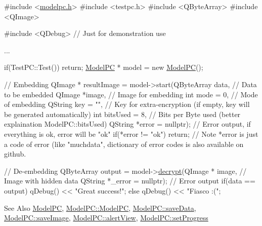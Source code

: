 \begin{DoxyCode}
\textcolor{preprocessor}{#include <\hyperlink{modelpc_8h}{modelpc.h}>}
\textcolor{preprocessor}{#include <testpc.h>}
\textcolor{preprocessor}{#include <QByteArray>}
\textcolor{preprocessor}{#include <QImage>}

\textcolor{preprocessor}{#include <QDebug>} \textcolor{comment}{// Just for demonstration use}

...

if(TestPC::Test())
    \textcolor{keywordflow}{return};
\hyperlink{class_model_p_c}{ModelPC} * model = \textcolor{keyword}{new} \hyperlink{class_model_p_c}{ModelPC}();

\textcolor{comment}{// Embedding}
QImage * resultImage = model->start(QByteArray data, \textcolor{comment}{// Data to be embedded}
                                    QImage *image, \textcolor{comment}{// Image for embedding}
                                    \textcolor{keywordtype}{int} mode = 0, \textcolor{comment}{// Mode of embedding}
                                    QString key = \textcolor{stringliteral}{""}, \textcolor{comment}{// Key for extra-encryption (if empty, key will be
       generated automatically)}
                                    \textcolor{keywordtype}{int} bitsUsed = 8, \textcolor{comment}{// Bits per Byte used (better explaination
       ModelPC::bitsUsed)}
                                    QString *error = \textcolor{keyword}{nullptr}); \textcolor{comment}{// Error output, if everything is ok, error
       will be "ok"}
\textcolor{keywordflow}{if}(*error != \textcolor{stringliteral}{"ok"})
    \textcolor{keywordflow}{return};
\textcolor{comment}{// Note *error is just a code of error (like "muchdata", dictionary of error codes is also available on
       github.}

\textcolor{comment}{// De-embedding}
QByteArray output = model->\hyperlink{class_model_p_c_a5995215a34a1e1f504035715a8013809}{decrypt}(QImage * image, \textcolor{comment}{// Image with hidden data}
                                   QString *\_error = \textcolor{keyword}{nullptr}); \textcolor{comment}{// Error output}
\textcolor{keywordflow}{if}(data == output)
   qDebug() << \textcolor{stringliteral}{"Great success!"};
\textcolor{keywordflow}{else}
   qDebug() << \textcolor{stringliteral}{"Fiasco :("};
\end{DoxyCode}
 \begin{DoxySeeAlso}{See Also}
\hyperlink{class_model_p_c}{Model\-P\-C}, \hyperlink{class_model_p_c_ae12ebe65ec973c02a0de4850a7c1e31c}{Model\-P\-C\-::\-Model\-P\-C}, \hyperlink{class_model_p_c_a0855107fb0ccc247cd9e893fae9bb08a}{Model\-P\-C\-::save\-Data}, \hyperlink{class_model_p_c_a41f5e2e8022679046e4d3fa1109025fa}{Model\-P\-C\-::save\-Image}, \hyperlink{class_model_p_c_af0217a7ca5671e26090dc50a5dccdaf5}{Model\-P\-C\-::alert\-View}, \hyperlink{class_model_p_c_afdcd80f0ed5062e145a71f09b0897547}{Model\-P\-C\-::set\-Progress}
\end{DoxySeeAlso}
